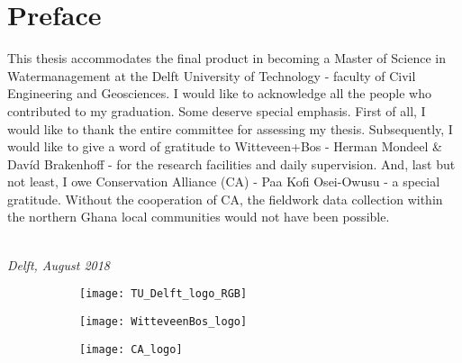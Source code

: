 \chapter*{Preface}
This thesis accommodates the final product in becoming a Master of Science in Watermanagement at the Delft University of Technology \-- faculty of Civil Engineering and Geosciences. I would like to acknowledge all the people who contributed to my graduation. Some deserve special emphasis. First of all, I would like to thank the entire committee for assessing my thesis. Subsequently, I would like to give a word of gratitude to Witteveen+Bos \-- Herman Mondeel \& Davíd Brakenhoff \-- for the research facilities and daily supervision. And, last but not least, I owe Conservation Alliance (CA) \-- Paa Kofi Osei-Owusu \-- a special gratitude. Without the cooperation of CA, the fieldwork data collection within the northern Ghana local communities would not have been possible.  


\begin{flushright}
{\makeatletter\itshape
    \@author \\
    Delft, August 2018
\makeatother}
\end{flushright}

\bigskip

% 
% 

 
\begin{figure}[ht]
	\centering
	\begin{subfigure}[a]{0.33\linewidth}
		\texttt{[image: TU\_Delft\_logo\_RGB]}
		\label{fig:TUlogo}
	\end{subfigure}\vfill
	\begin{subfigure}[b]{0.33\linewidth}
        \texttt{[image: WitteveenBos\_logo]}
		\label{fig:WBlogo}
		\bigskip
		\bigskip
	\end{subfigure}\vfill
	\begin{subfigure}[c]{0.33\linewidth}
		\texttt{[image: CA\_logo]}
		\label{fig:CAlogo}	
	\end{subfigure} 
\end{figure} 
